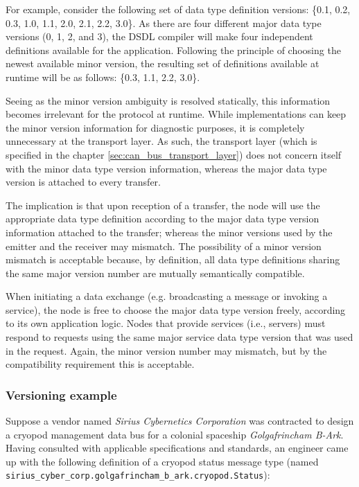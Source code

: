 For example, consider the following set of data type definition versions:
\{0.1, 0.2, 0.3, 1.0, 1.1, 2.0, 2.1, 2.2, 3.0\}.
As there are four different major data type versions (0, 1, 2, and 3),
the DSDL compiler will make four independent definitions available for the application.
Following the principle of choosing the newest available minor version,
the resulting set of definitions available at runtime will be as follows:
\{0.3, 1.1, 2.2, 3.0\}.

Seeing as the minor version ambiguity is resolved statically,
this information becomes irrelevant for the protocol at runtime.
While implementations can keep the minor version information for diagnostic purposes,
it is completely unnecessary at the transport layer.
As such, the transport layer (which is specified in the chapter \ref{sec:can_bus_transport_layer})
does not concern itself with the minor data type version information,
whereas the major data type version is attached to every transfer.

The implication is that upon reception of a transfer, the node will use the appropriate
data type definition according to the major data type version information attached to the
transfer; whereas the minor versions used by the emitter and the receiver may mismatch.
The possibility of a minor version mismatch is acceptable because, by definition,
all data type definitions sharing the same major version number are mutually semantically compatible.

When initiating a data exchange (e.g. broadcasting a message or invoking a service),
the node is free to choose the major data type version freely, according to its own application logic.
Nodes that provide services (i.e., servers) must respond to requests using the same major service data type
version that was used in the request.
Again, the minor version number may mismatch, but by the compatibility requirement this is acceptable.

\subsubsection{Versioning example}

Suppose a vendor named \emph{Sirius Cybernetics Corporation} was contracted to design a
cryopod management data bus for a colonial spaceship \emph{Golgafrincham B-Ark}.
Having consulted with applicable specifications and standards, an engineer came up with the following
definition of a cryopod status message type (named \verb|sirius_cyber_corp.golgafrincham_b_ark.cryopod.Status|):

